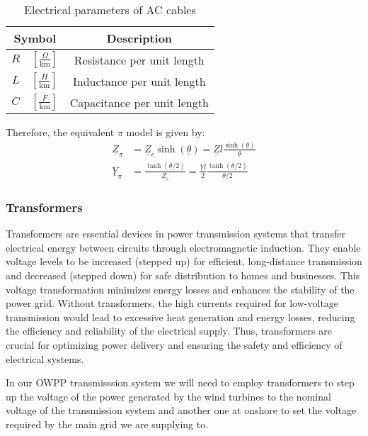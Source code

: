 \documentclass[a4paper,11pt, titlepage, twoside]{article}
\begin{document}

\begin{table}[h]
\centering
\begin{tabular}{|c|c|}
\hline
Symbol & Description \\
\hline
$R \quad \left[\frac{\Omega}{\text{km}}\right]$  & Resistance per unit length \\
$L \quad \left[\frac{H}{\text{km}}\right]$ & Inductance per unit length \\
$C \quad \left[\frac{F}{\text{km}}\right]$ & Capacitance per unit length \\
\hline
\end{tabular}
\caption{Electrical parameters of AC cables}
\label{tab:parameters}
\end{table} 



Therefore, the equivalent $\pi$ model is given by:
\begin{align}
\underline{Z}_{\pi} &= \underline{Z}_c \sinh(\underline{\theta}) = \underline{Z} l \frac{\sinh(\underline{\theta})}{\underline{\theta}} \\
\underline{Y}_{\pi} &= \frac{\tanh(\underline{\theta}/2)}{\underline{Z}_c} = \frac{\underline{Y} l}{2} \frac{\tanh(\underline{\theta}/2)}{\underline{\theta}/2}
\end{align}

\subsubsection{Transformers}
Transformers are essential devices in power transmission systems that transfer electrical energy between circuits through electromagnetic induction.
They enable voltage levels to be increased (stepped up) for efficient, long-distance transmission and decreased (stepped down) for safe distribution to homes and businesses.
This voltage transformation minimizes energy losses and enhances the stability of the power grid. Without transformers, the high currents required for low-voltage transmission would lead to excessive heat generation and energy losses,
reducing the efficiency and reliability of the electrical supply. Thus, transformers are crucial for optimizing power delivery and ensuring the safety and efficiency of electrical systems.

In our OWPP transmisssion system we will need to employ transformers to step up the voltage of the power generated by the wind turbines to the nominal voltage of the transmission system and another one at onshore to set
the voltage required by the main grid we are supplying to.
\end{document}
